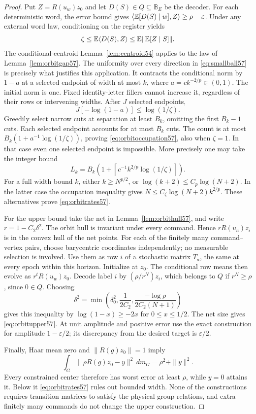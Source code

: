 \begin{proof}
Put $Z=R(u_w)z_0$ and let $D(S)\in Q\subseteq\mathbb B_E$ be the decoder. For each deterministic word, the error bound gives
$\langle\mathbb E[D(S)\mid w],Z\rangle\ge\rho-\varepsilon$.
Under any external word law, conditioning on the register yields
\[
 \zeta\le\mathbb E\langle D(S),Z\rangle
          \le\mathbb E\|\mathbb E[Z\mid S]\|.
\]
The conditional-centroid Lemma~\ref{lem:centroid54} applies to the law of Lemma~\ref{lem:orbitgap57}. The uniformity over every direction in \eqref{eq:smallball57} is precisely what justifies this application. It contracts the conditional norm by $1-a$ at a selected endpoint of width at most $k$, where $a=c k^{-2/p}\in(0,1)$. The initial norm is one. Fixed identity-letter fillers cannot increase it, regardless of their rows or intervening widths. After $J$ selected endpoints,
\[
 J[-\log(1-a)]\le\log(1/\zeta).
\]
Greedily select narrow cuts at separation at least $B_k$, omitting the first $B_k-1$ cuts. Each selected endpoint accounts for at most $B_k$ cuts. The count is at most $B_k(1+a^{-1}\log(1/\zeta))$, proving \eqref{eq:orbitoccupation57}, also when $\zeta=1$. In that case even one selected endpoint is impossible. More precisely one may take the integer bound
\[
 L_k=B_k\left(1+\left\lceil c^{-1}k^{2/p}\log(1/\zeta)\right\rceil\right).
\]
For a full width bound $k$, either $k\ge N^{p/2}$, or
$\log(k+2)\le C_p\log(N+2)$. In the latter case the occupation inequality
gives $N\le C_\zeta\log(N+2)k^{2/p}$. These alternatives prove
\eqref{eq:orbitrates57}.

For the upper bound take the net in Lemma~\ref{lem:orbithull57}, and write $r=1-C_2\delta^2$. The orbit hull is invariant under every command. Hence $rR(u_a)z_i$ is in the convex hull of the net points. For each of the finitely many command--vertex pairs, choose barycentric coordinates independently; no measurable selection is involved. Use them as row $i$ of a stochastic matrix $T_a$, the same at every epoch within this horizon. Initialize at $z_0$. The conditional row means then evolve as $r^tR(u_w)z_0$. Decode label $i$ by $(\rho/r^N)z_i$, which belongs to $Q$ if $r^N\ge\rho$, since $0\in Q$. Choosing
\[
 \delta^2=\min\left(\delta_0^2,\frac1{2C_2},
                          \frac{-\log\rho}{2C_2(N+1)}\right)
\]
gives this inequality by $\log(1-x)\ge-2x$ for $0\le x\le1/2$. The net size gives \eqref{eq:orbitupper57}. At unit amplitude and positive error use the exact construction for amplitude $1-\varepsilon/2$; its discrepancy from the desired target is $\varepsilon/2$.

Finally, Haar mean zero and $\|R(g)z_0\|=1$ imply
\[
 \int_G\|\rho R(g)z_0-y\|^2\,dm_G=\rho^2+\|y\|^2.
\]
Every constrained center therefore has worst error at least $\rho$, while $y=0$ attains it. Below it \eqref{eq:orbitrates57} rules out bounded width. None of the constructions requires transition matrices to satisfy the physical group relations, and extra finitely many commands do not change the upper construction.
\end{proof}
